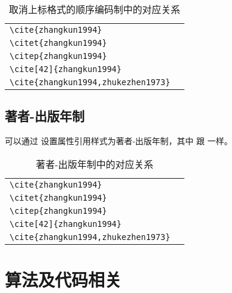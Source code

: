 \documentclass[report, twoside, UTF8, AutoFakeBold = 1, AutoFakeSlant, zihao = -4]{config}
\begin{document}
\begin{table}[H]
  \centering
  \caption{取消上标格式的顺序编码制中的对应关系}
      \begin{tabular}{l@{\quad$\Rightarrow$\quad}l}
      \verb|\cite{zhangkun1994}|               & \cite{zhangkun1994}               \\
      \verb|\citet{zhangkun1994}|              & \citet{zhangkun1994}              \\
      \verb|\citep{zhangkun1994}|              & \citep{zhangkun1994}              \\
      \verb|\cite[42]{zhangkun1994}|           & \cite[42]{zhangkun1994}           \\
      \verb|\cite{zhangkun1994,zhukezhen1973}| & \cite{zhangkun1994,zhukezhen1973} \\
      \end{tabular}
\end{table}

\section{著者-出版年制}

可以通过  设置属性引用样式为著者-出版年制，其中  
跟  一样。


\begin{table}[H]
  \centering
  \caption{著者-出版年制中的对应关系}
      \begin{tabular}{l@{\quad$\Rightarrow$\quad}l}
      \verb|\cite{zhangkun1994}|               & \cite{zhangkun1994}               \\
      \verb|\citet{zhangkun1994}|              & \citet{zhangkun1994}              \\
      \verb|\citep{zhangkun1994}|              & \citep{zhangkun1994}              \\
      \verb|\cite[42]{zhangkun1994}|           & \cite[42]{zhangkun1994}           \\
      \verb|\cite{zhangkun1994,zhukezhen1973}| & \cite{zhangkun1994,zhukezhen1973} \\
      \end{tabular}
\end{table}


\chapter{算法及代码相关}
\end{document}
